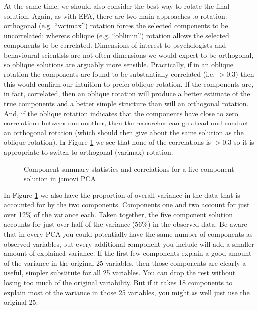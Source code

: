 At the same time, we should also consider the best way to rotate the final solution. Again, as with EFA, there are two main approaches to rotation: orthogonal (e.g. “varimax”) rotation forces the selected components to be uncorrelated; whereas oblique (e.g. “oblimin”) rotation allows the selected components to be correlated. Dimensions of interest to psychologists and behavioural scientists are not often dimensions we would expect to be orthogonal, so oblique solutions are arguably more sensible. Practically, if in an oblique rotation the components are found to be substantially correlated (i.e. $>0.3$) then this would confirm our intuition to prefer oblique rotation. If the components are, in fact, correlated, then an oblique rotation will produce a better estimate of the true components and a better simple structure than will an orthogonal rotation. And, if the oblique rotation indicates that the components have close to zero correlations between one another, then the researcher can go ahead and conduct an orthogonal rotation (which should then give about the same solution as the oblique rotation). In Figure \ref{fig:pca4} we see that none of the correlations is $>0.3$ so it is appropriate to switch to orthogonal (varimax) rotation.

\begin{figure}[!htb]
\begin{center}
\caption{Component summary statistics and correlations for a five component solution in jamovi PCA}
\label{fig:pca4}
\HR
\end{center}
\end{figure}

In Figure \ref{fig:pca4} we also have the proportion of overall variance in the data that is accounted for by the two components. Components one and two account for just over 12\% of the variance each. Taken together, the five component solution accounts for just over half of the variance (56\%) in the observed data. Be aware that in every PCA you could potentially have the same number of components as observed variables, but every additional component you include will add a smaller amount of explained variance. If the first few components explain a good amount of the variance in the original 25 variables, then those components are clearly a useful, simpler substitute for all 25 variables. You can drop the rest without losing too much of the original variability. But if it takes 18 components to explain most of the variance in those 25 variables, you might as well just use the original 25.

